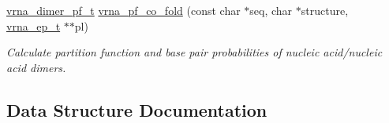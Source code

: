 \begin{DoxyCompactItemize}
\mbox{\hyperlink{group__pf__cofold_ga444df1587c9a2ca15b8eb25188f629c3}{vrna\+\_\+dimer\+\_\+pf\+\_\+t}} \mbox{\hyperlink{group__part__func__global_gaf2b846f7ac382686f35ff7b9202fdd5c}{vrna\+\_\+pf\+\_\+co\+\_\+fold}} (const char $\ast$seq, char $\ast$structure, \mbox{\hyperlink{group__struct__utils__plist_gab9ac98ab55ded9fb90043b024b915aca}{vrna\+\_\+ep\+\_\+t}} $\ast$$\ast$pl)
\begin{DoxyCompactList}\small\item\em Calculate partition function and base pair probabilities of nucleic acid/nucleic acid dimers. \end{DoxyCompactList}\end{DoxyCompactItemize}


\subsection{Data Structure Documentation}
\label{structvrna__dimer__pf__s}
